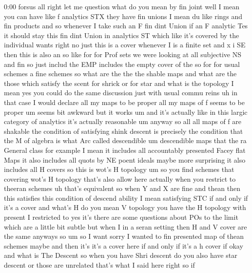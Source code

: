 \begin{unfinished}{0:00}
forsus  all  right  let
me
question  what  do  you  mean  by  fin
joint  well  I  mean  you  can  have  like  f
analytics  STX  they  have  fin  unions  I
mean  du  like  rings  and  fin
products  and  so  whenever  I  take  such  an
F  fin  dint  Union  if  an  F  analytic  Tes  it
should  stay  this  fin  dint  Union
in  analytics  ST  which  like  it's  covered
by  the  individual  wants
right  no
just  this  is  a  cover  whenever  I  is  a
finite  set  and  x  i  SE  then  this  is  also
an  so  like  for  for  Prof  sets  we  were
looking  at  all  subjective  NS  and
fin  so  just  includ  the  EMP  includes  the
empty  cover  of
the  so  for  for  usual  schemes  a  fine
schemes  so  what  are  the  the  the  shable
maps  and  what  are  the  those  which
satisfy  the  scent  for  shrick  or  for  star
and  what  is  the  topology  I  mean
yes  you  could  do  the  same  discussion
just  with  usual  commu  reins  uh  in  that
case  I  would  declare  all  my  maps  to  be
proper  all  my  maps  of  f  seems  to  be
proper
um  seems  bit  awkward  but  it  works  um  and
it's  actually  like  in  this  largic
category  of  analytics  it's  actually
reasonable  um  anyway  so  all  all  maps  of
f  are  shakable  the  condition  of
satisfying  shink  descent  is  precisely
the  condition  that  the  M  of  algebra  is
what  Arc  called
descendible
um  descendible  maps  that  the  ra  General
class  for  example  I  mean  it  includes  all
accountably  presented  Facey  flat
Maps  it  also  includes  all  quots  by  NE
poent
ideals  maybe  more
surprising  it  also  includes  all  H
covers  so  this  is  wot's  H
topology  um  so  you  find  schemes  that
covering  wot's  H  topology  that's  also
allow
here  actually  when  you  restrict  to
theeran  schemes  uh  that's  equivalent  so
when  Y  and  X  are  fine  and  thean  then
this  satisfies  this  condition  of  descend
ability  I  mean  satisfying  STC  if  and
only  if  it's  a  cover  and  what's  H  do  you
mean  V  topology  you  have  the  H  topology
with  present  I  restricted  to  yes  it's
there  are  some  questions  about  POs  to
the  limit  which  are  a  little  bit  subtle
but  when  I  in  a  seran  setting  then  H  and
V  cover  are  the  same  anyways
so  um  so  I  want  sorry  I  wanted  to  fin
presented  map  of  thean  schemes  maybe  and
then  it's  it's  a  cover  here  if  and  only
if  it's  a  h
cover
if  okay  and  what  is  The  Descent  so  when
you  have  Shri  descent  do  you  also  have
star  descent  or  those  are  unrelated
that's  what  I  said  here  right  so  if

\end{unfinished}
